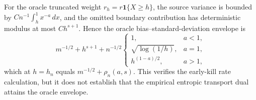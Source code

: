 For the oracle truncated weight \(r_h=r\mathbf 1\{X\ge h\}\), the source variance is bounded by \(Cn^{-1}\int_h^1x^{-a}\,dx\), and the omitted boundary contribution has deterministic modulus at most \(C h^{s+1}\). Hence the oracle bias--standard-deviation envelope is \[m^{-1/2}+h^{s+1}+n^{-1/2}\begin{cases}1,&a<1,\\ \sqrt{\log(1/h)},&a=1,\\ h^{(1-a)/2},&a>1,\end{cases}\] which at \(h=h_n\) equals \(m^{-1/2}+\rho_n(a,s)\). This verifies the early-kill rate calculation, but it does not establish that the empirical entropic transport dual attains the oracle envelope.